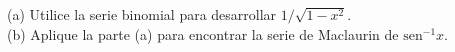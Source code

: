 \item (a) Utilice la serie binomial para desarrollar $1/\sqrt{1-x^2}$. \\
    (b) Aplique la parte (a) para encontrar la serie de Maclaurin de $\text{sen}^{-1} x$.
